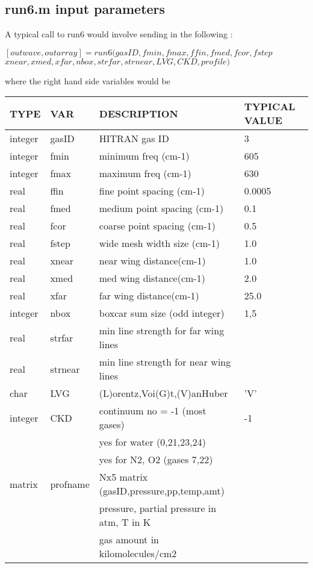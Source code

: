\documentclass[11pt]{article}
\begin{document}
\subsection{run6.m input parameters}

A typical call to run6 would involve sending in the following : 

$[outwave,outarray]=run6(gasID,fmin,fmax,ffin,fmed,fcor,fstep$\\
         $xnear,xmed,xfar,nbox,strfar,strnear,LVG,CKD,profile)$

where the right hand side variables would be 

\begin{longtable}{llll}
\hline
\hline
  TYPE  &   VAR  &         DESCRIPTION  &            TYPICAL VALUE\\
\hline
\hline
integer & gasID  &       HITRAN gas ID      &            3\\
\hline
integer & fmin    &      minimum freq (cm-1) &          605\\
integer & fmax    &      maximum freq (cm-1) &          630\\
\hline
real   &  ffin    &      fine point spacing (cm-1) &    0.0005\\
real   &  fmed    &      medium point spacing (cm-1)&   0.1\\
real   &  fcor    &      coarse point spacing (cm-1)  & 0.5\\
\hline
real   &  fstep   &      wide mesh width size (cm-1) &    1.0\\
real   &  xnear   &      near wing distance(cm-1)    &    1.0\\
real   &  xmed    &      med wing distance(cm-1)     &    2.0\\
real   &  xfar    &      far wing distance(cm-1)     &    25.0\\
\hline
integer & nbox     &     boxcar sum size (odd integer) &  1,5\\
\hline
real   &  strfar   &    min line strength for far wing lines & \\
real   &  strnear  &    min line strength for near wing lines& \\
\hline
char   &  LVG       &    (L)orentz,Voi(G)t,(V)anHuber    &  'V'\\
\hline
integer&  CKD       &    continuum no  = -1 (most gases) &  -1\\
       &            &    yes for water (0,21,23,24)      &  \\
       &            &    yes for N2, O2 (gases 7,22)     &  \\
\hline
matrix & profname   & Nx5 matrix (gasID,pressure,pp,temp,amt)   & \\
       &            & pressure, partial pressure in atm, T in K & \\
       &            & gas amount in kilomolecules/cm2           & \\
\hline
\hline
\end{longtable}
\end{document}
